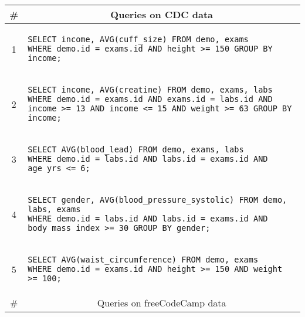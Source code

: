 \begin{tabular}{cl}
\toprule
\# & \multicolumn{1}{c}{Queries on CDC data} \\
\midrule
1 & 
\begin{minipage}{6in}
\begin{lstlisting}[breaklines]
SELECT income, AVG(cuff_size) FROM demo, exams 
WHERE demo.id = exams.id AND height >= 150 GROUP BY income;
\end{lstlisting}
\end{minipage}{queryno}\label[query]{q1} \\
2 & 
\begin{minipage}{6in}
\begin{lstlisting}[breaklines]
SELECT income, AVG(creatine) FROM demo, exams, labs 
WHERE demo.id = exams.id AND exams.id = labs.id AND income >= 13 AND income <= 15 AND weight >= 63 GROUP BY income;
\end{lstlisting}
\end{minipage}
{queryno}\label[query]{q2} \\
3 & 
\begin{minipage}{6in}
\begin{lstlisting}[breaklines]
SELECT AVG(blood_lead) FROM demo, exams, labs 
WHERE demo.id = labs.id AND labs.id = exams.id AND age_yrs <= 6;
\end{lstlisting}
\end{minipage}{queryno}\label[query]{q3}\\
4 & 
\begin{minipage}{6in}
\begin{lstlisting}[breaklines]
SELECT gender, AVG(blood_pressure_systolic) FROM demo, labs, exams 
WHERE demo.id = labs.id AND labs.id = exams.id AND body_mass_index >= 30 GROUP BY gender;
\end{lstlisting}
\end{minipage}{queryno}\label[query]{q4}\\
5 & 
\begin{minipage}{6in}
\begin{lstlisting}[breaklines]
SELECT AVG(waist_circumference) FROM demo, exams 
WHERE demo.id = exams.id AND height >= 150 AND weight >= 100;
\end{lstlisting}
\end{minipage}{queryno}\label[query]{q5}\\
\# & \multicolumn{1}{c}{Queries on freeCodeCamp data} \\

\end{tabular}
